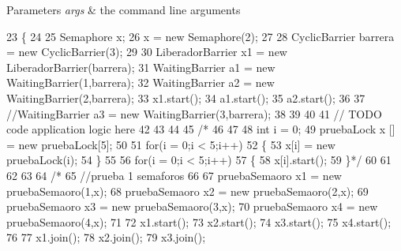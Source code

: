 \begin{DoxyParams}{Parameters}
{\em args} & the command line arguments \\
\hline
\end{DoxyParams}

\begin{DoxyCode}
23                                                                        \{
24         
25         Semaphore x;
26         x = \textcolor{keyword}{new} Semaphore(2);
27         
28         CyclicBarrier barrera = \textcolor{keyword}{new} CyclicBarrier(3);
29         
30         LiberadorBarrier x1 = \textcolor{keyword}{new} LiberadorBarrier(barrera);
31         WaitingBarrier a1 = \textcolor{keyword}{new} WaitingBarrier(1,barrera);
32         WaitingBarrier a2 = \textcolor{keyword}{new} WaitingBarrier(2,barrera);
33         x1.start();
34         a1.start();
35         a2.start();
36         
37         \textcolor{comment}{//WaitingBarrier a3 = new WaitingBarrier(3,barrera);}
38         
39         
40         
41         \textcolor{comment}{// TODO code application logic here}
42         
43         
44         
45         \textcolor{comment}{/*}
46 \textcolor{comment}{        }
47 \textcolor{comment}{        }
48 \textcolor{comment}{        int i = 0;}
49 \textcolor{comment}{        pruebaLock x [] = new pruebaLock[5];}
50 \textcolor{comment}{        }
51 \textcolor{comment}{        for(i = 0;i < 5;i++)}
52 \textcolor{comment}{        \{}
53 \textcolor{comment}{            x[i] = new pruebaLock(i);}
54 \textcolor{comment}{        \}}
55 \textcolor{comment}{        }
56 \textcolor{comment}{        for(i = 0;i < 5;i++)}
57 \textcolor{comment}{        \{}
58 \textcolor{comment}{            x[i].start();}
59 \textcolor{comment}{        \}*/}
60         
61         
62         
63         
64         \textcolor{comment}{/*}
65 \textcolor{comment}{        //prueba 1 semaforos}
66 \textcolor{comment}{        }
67 \textcolor{comment}{        pruebaSemaoro x1 = new pruebaSemaoro(1,x);}
68 \textcolor{comment}{        pruebaSemaoro x2 = new pruebaSemaoro(2,x);}
69 \textcolor{comment}{        pruebaSemaoro x3 = new pruebaSemaoro(3,x);}
70 \textcolor{comment}{        pruebaSemaoro x4 = new pruebaSemaoro(4,x);}
71 \textcolor{comment}{        }
72 \textcolor{comment}{        x1.start();}
73 \textcolor{comment}{        x2.start();}
74 \textcolor{comment}{        x3.start();}
75 \textcolor{comment}{        x4.start();}
76 \textcolor{comment}{        }
77 \textcolor{comment}{        x1.join();}
78 \textcolor{comment}{        x2.join();}
79 \textcolor{comment}{        x3.join();}

\end{DoxyCode}
